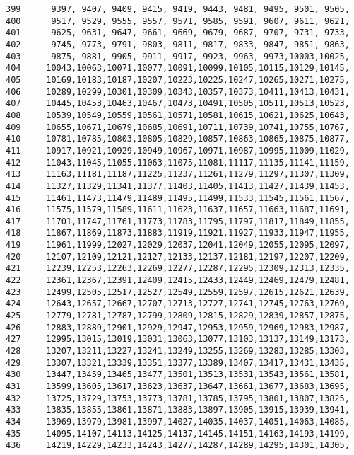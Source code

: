 \begin{Code}
\begin{verbatim}
399      9397, 9407, 9409, 9415, 9419, 9443, 9481, 9495, 9501, 9505,
400      9517, 9529, 9555, 9557, 9571, 9585, 9591, 9607, 9611, 9621,
401      9625, 9631, 9647, 9661, 9669, 9679, 9687, 9707, 9731, 9733,
402      9745, 9773, 9791, 9803, 9811, 9817, 9833, 9847, 9851, 9863,
403      9875, 9881, 9905, 9911, 9917, 9923, 9963, 9973,10003,10025,
404     10043,10063,10071,10077,10091,10099,10105,10115,10129,10145,
405     10169,10183,10187,10207,10223,10225,10247,10265,10271,10275,
406     10289,10299,10301,10309,10343,10357,10373,10411,10413,10431,
407     10445,10453,10463,10467,10473,10491,10505,10511,10513,10523,
408     10539,10549,10559,10561,10571,10581,10615,10621,10625,10643,
409     10655,10671,10679,10685,10691,10711,10739,10741,10755,10767,
410     10781,10785,10803,10805,10829,10857,10863,10865,10875,10877,
411     10917,10921,10929,10949,10967,10971,10987,10995,11009,11029,
412     11043,11045,11055,11063,11075,11081,11117,11135,11141,11159,
413     11163,11181,11187,11225,11237,11261,11279,11297,11307,11309,
414     11327,11329,11341,11377,11403,11405,11413,11427,11439,11453,
415     11461,11473,11479,11489,11495,11499,11533,11545,11561,11567,
416     11575,11579,11589,11611,11623,11637,11657,11663,11687,11691,
417     11701,11747,11761,11773,11783,11795,11797,11817,11849,11855,
418     11867,11869,11873,11883,11919,11921,11927,11933,11947,11955,
419     11961,11999,12027,12029,12037,12041,12049,12055,12095,12097,
420     12107,12109,12121,12127,12133,12137,12181,12197,12207,12209,
421     12239,12253,12263,12269,12277,12287,12295,12309,12313,12335,
422     12361,12367,12391,12409,12415,12433,12449,12469,12479,12481,
423     12499,12505,12517,12527,12549,12559,12597,12615,12621,12639,
424     12643,12657,12667,12707,12713,12727,12741,12745,12763,12769,
425     12779,12781,12787,12799,12809,12815,12829,12839,12857,12875,
426     12883,12889,12901,12929,12947,12953,12959,12969,12983,12987,
427     12995,13015,13019,13031,13063,13077,13103,13137,13149,13173,
428     13207,13211,13227,13241,13249,13255,13269,13283,13285,13303,
429     13307,13321,13339,13351,13377,13389,13407,13417,13431,13435,
430     13447,13459,13465,13477,13501,13513,13531,13543,13561,13581,
431     13599,13605,13617,13623,13637,13647,13661,13677,13683,13695,
432     13725,13729,13753,13773,13781,13785,13795,13801,13807,13825,
433     13835,13855,13861,13871,13883,13897,13905,13915,13939,13941,
434     13969,13979,13981,13997,14027,14035,14037,14051,14063,14085,
435     14095,14107,14113,14125,14137,14145,14151,14163,14193,14199,
436     14219,14229,14233,14243,14277,14287,14289,14295,14301,14305,

\end{verbatim}
\end{Code}
